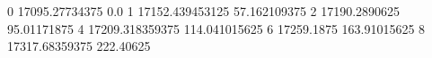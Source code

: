 0 17095.27734375 0.0
1 17152.439453125 57.162109375
2 17190.2890625 95.01171875
4 17209.318359375 114.041015625
6 17259.1875 163.91015625
8 17317.68359375 222.40625
